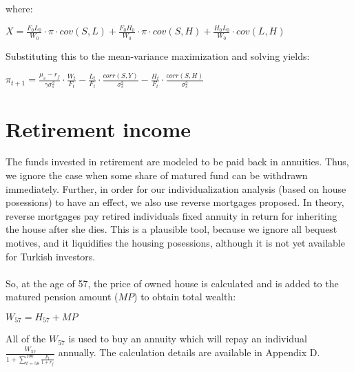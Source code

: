 where:

\begin{center}
	$X = \frac{F_0 L_0}{W_0} \cdot \pi\cdot cov(S,L) + \frac{F_0 H_0}{W_0} \cdot \pi\cdot cov(S,H) + \frac{H_0 L_0}{W_0} \cdot cov(L,H)$
\end{center}

Substituting this to the mean-variance maximization and solving yields:

\begin{center}
	$\pi_{t+1} = \frac{\mu_s - r_f}{\gamma \sigma^2_s} \cdot \frac{W_t}{F_t} - \frac{L_t}{F_t} \cdot \frac{corr(S,Y)}{\sigma^2_s} - \frac{H_t}{F_t} \cdot \frac{corr(S,H)}{\sigma^2_s}$
\end{center}


\section{Retirement income}

The funds invested in retirement are modeled to be paid back in annuities. Thus, we ignore the case when some share of matured fund can be withdrawn immediately. Further, in order for our individualization analysis (based on house posessions) to have an effect, we also use reverse mortgages proposed. In theory, reverse mortgages pay retired individuals fixed annuity in return for inheriting the house after she dies. This is a plausible tool, because we ignore all bequest motives, and it liquidifies the housing posessions, although it is not yet available for Turkish investors. 

\paragraph{}So, at the age of 57, the price of owned house is calculated and is added to the matured pension amount ($MP$) to obtain total wealth:

\begin{center}
	$W_{57} = H_{57} + MP$
\end{center}

All of the $W_{57}$ is used to buy an annuity which will repay an individual $\frac{W_{57}}{1+\sum^{100}_{t=58} \frac{p_t}{1+r_f}}$ annually. The calculation details are available in Appendix D. 
